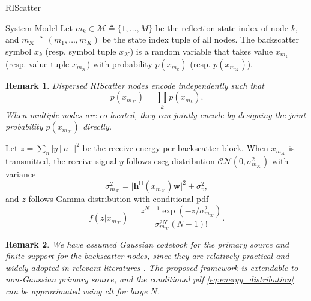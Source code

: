 \documentclass[journal]{IEEEtran}
\newtheorem{remark}{Remark}
\begin{document}
\begin{section}{RIScatter}
\begin{subsection}{System Model}
		Let $m_k \in \mathcal{M} \triangleq \{1,\ldots,M\}$ be the reflection state index of node $k$, and $m_{\mathcal{K}} \triangleq (m_1,\ldots,m_K)$ be the state index tuple of all nodes.
		The backscatter symbol $x_k$ (resp. symbol tuple $x_{\mathcal{K}}$) is a random variable that takes value $x_{m_k}$ (resp. value tuple $x_{m_{\mathcal{K}}}$) with probability $p(x_{m_k})$ (resp. $p(x_{m_{\mathcal{K}}})$).
		\begin{remark}
			Dispersed RIScatter nodes encode independently such that
			\begin{equation}
				p(x_{m_{\mathcal{K}}}) = \prod_k p(x_{m_k}).
				\label{eq:equivalent_distribution}
			\end{equation}
			When multiple nodes are co-located, they can jointly encode by designing the joint probability $p(x_{m_{\mathcal{K}}})$ directly.
			\label{re:independent_encoding}
		\end{remark}

		Let $z=\sum_{n} \bigl\lvert y[n] \bigr\rvert^2$ be the receive energy per backscatter block.
		When $x_{m_\mathcal{K}}$ is transmitted, the receive signal $y$ follows \gls{cscg} distribution $\mathcal{CN}(0,\sigma_{m_{\mathcal{K}}}^2)$ with variance
		\begin{equation}
			\sigma_{m_{\mathcal{K}}}^2 = \lvert \boldsymbol{h}^\mathsf{H}(x_{m_{\mathcal{K}}}) \boldsymbol{w} \rvert^2 + \sigma_v^2,
			\label{eq:receive_variance}
		\end{equation}
		and $z$ follows Gamma distribution with conditional \gls{pdf}
		\begin{equation}
			f(z|x_{m_{\mathcal{K}}}) = \frac{z^{N-1} \exp(-z/\sigma_{m_{\mathcal{K}}}^2)}{\sigma_{m_{\mathcal{K}}}^{2N} (N-1)!}.
			\label{eq:energy_distribution}
		\end{equation}

		\begin{remark}
			We have assumed Gaussian codebook for the primary source and finite support for the backscatter nodes, since they are relatively practical and widely adopted in relevant literatures \cite{Long2020a,Liang2020,Guo2019b,Qian2019b,Ding2020,Hassani2023,Zhou2019a,Wu2021a,Xu2021a,Yang2021a,Yang2018,Han2021,Zhang2022,Dai2023}.
			The proposed framework is extendable to non-Gaussian primary source, and the conditional \gls{pdf} \eqref{eq:energy_distribution} can be approximated using \gls{clt} for large $N$.
			\label{re:non_gaussian}
		\end{remark}


\end{subsection}
\end{section}
\end{document}
